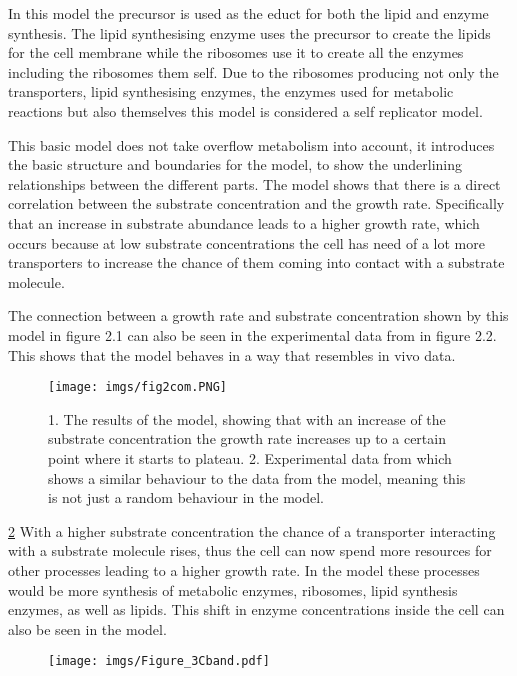In this model the precursor is used as the educt for both the lipid and enzyme synthesis. The lipid synthesising enzyme uses the precursor to create the lipids for the cell membrane while the ribosomes use it to create all the enzymes including the ribosomes them self. Due to the ribosomes producing not only the transporters, lipid synthesising enzymes, the enzymes used for metabolic reactions but also themselves this model is considered a self replicator model. 

This basic model does not take overflow metabolism into account, it introduces the basic structure and boundaries for the model, to show the underlining relationships between the different parts. The model shows that there is a direct correlation between the substrate concentration and the growth rate. Specifically that an increase in substrate abundance leads to a higher growth rate, which occurs because at low substrate concentrations the cell has need of a lot more transporters to increase the chance of them coming into contact with a substrate molecule. 

The connection between a growth rate and substrate concentration shown by this model in figure 2.1 can also be seen in the experimental data from \cite{schulze1964} in figure 2.2. This shows that the model behaves in a way that resembles in vivo data.

\begin{figure}[H]
    \centering
    \texttt{[image: imgs/fig2com.PNG]}
    \caption{1. The results of the model, showing that with an increase of the substrate concentration the growth rate increases up to a certain point where it starts to plateau. 2. Experimental data from \cite{schulze1964} which shows a similar behaviour to the data from the model, meaning this is not just a random behaviour in the model.}
    \label{fig:fig2com}
\end{figure}

\ref{fig:Figure_3Cband} With a higher substrate concentration the chance of a transporter interacting with a substrate molecule rises, thus the cell can now spend more resources for other processes leading to a higher growth rate.
In the model these processes would be more synthesis of metabolic enzymes, ribosomes, lipid synthesis enzymes, as well as lipids. This shift in enzyme concentrations inside the cell can also be seen in the model.

\begin{figure}[H]
    \centering
    \texttt{[image: imgs/Figure\_3Cband.pdf]}
    \caption{}
    \label{fig:Figure_3Cband}
\end{figure}

